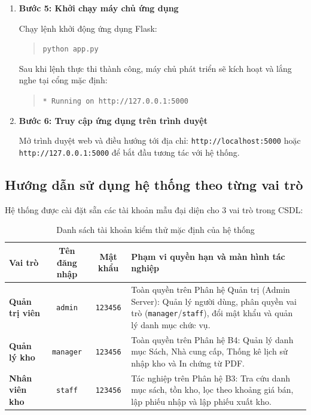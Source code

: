 \documentclass[12pt,a4paper]{article}
\begin{document}
\begin{enumerate}
    \item \textbf{Bước 5: Khởi chạy máy chủ ứng dụng}
    
    Chạy lệnh khởi động ứng dụng Flask:
    \begin{quote}
        \texttt{python app.py}
    \end{quote}
    Sau khi lệnh thực thi thành công, máy chủ phát triển sẽ kích hoạt và lắng nghe tại cổng mặc định:
    \begin{quote}
        \texttt{* Running on http://127.0.0.1:5000}
    \end{quote}

    \item \textbf{Bước 6: Truy cập ứng dụng trên trình duyệt}
    
    Mở trình duyệt web và điều hướng tới địa chỉ: \texttt{http://localhost:5000} hoặc \texttt{http://127.0.0.1:5000} để bắt đầu tương tác với hệ thống.
\end{enumerate}

\subsection{Hướng dẫn sử dụng hệ thống theo từng vai trò}
\label{subsec:huong-dan-su-dung}

Hệ thống được cài đặt sẵn các tài khoản mẫu đại diện cho 3 vai trò trong CSDL:
\begin{table}[H]
\centering
\small
\renewcommand{\arraystretch}{1.2}
\begin{tabularx}{\textwidth}{|>{\raggedright\arraybackslash}p{2.8cm}|c|c|>{\raggedright\arraybackslash}X|}
\hline
\textbf{Vai trò} & \textbf{Tên đăng nhập} & \textbf{Mật khẩu} & \textbf{Phạm vi quyền hạn và màn hình tác nghiệp} \\
\hline
\textbf{Quản trị viên} & \texttt{admin} & \texttt{123456} & Toàn quyền trên Phân hệ Quản trị (Admin Server): Quản lý người dùng, phân quyền vai trò (\texttt{manager}/\texttt{staff}), đổi mật khẩu và quản lý danh mục chức vụ. \\
\hline
\textbf{Quản lý kho} & \texttt{manager} & \texttt{123456} & Toàn quyền trên Phân hệ B4: Quản lý danh mục Sách, Nhà cung cấp, Thống kê lịch sử nhập kho và In chứng từ PDF. \\
\hline
\textbf{Nhân viên kho} & \texttt{staff} & \texttt{123456} & Tác nghiệp trên Phân hệ B3: Tra cứu danh mục sách, tồn kho, lọc theo khoảng giá bán, lập phiếu nhập và lập phiếu xuất kho. \\
\hline
\end{tabularx}
\caption{Danh sách tài khoản kiểm thử mặc định của hệ thống}
\label{tab:tai-khoan-test}
\end{table}
\end{document}
